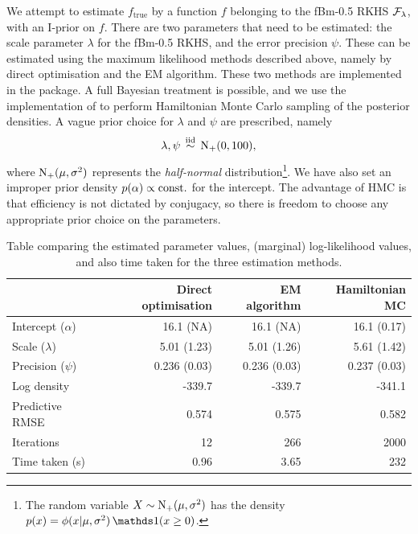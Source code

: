 We attempt to estimate $f_\text{true}$ by a function $f$ belonging to the fBm-0.5 RKHS ${\mathcal F}_\lambda$, with an I-prior on $f$.
There are two parameters that need to be estimated: the scale parameter $\lambda$ for the fBm-0.5 RKHS, and the error precision $\psi$.
These can be estimated using the maximum likelihood methods described above, namely by direct optimisation and the EM algorithm.
These two methods are implemented in the  package. 
A full Bayesian treatment is possible, and we use the  implementation of  to perform Hamiltonian Monte Carlo sampling of the posterior densities.
A vague prior choice for $\lambda$ and $\psi$ are prescribed, namely
\[
  \lambda,\psi \,\overset{\text{iid}}{\sim}\, \operatorname{N}_+(0,100),
\]
where $\operatorname{N}_+(\mu,\sigma^2)$ represents the \emph{half-normal} distribution\footnote{The random variable $X \sim \operatorname{N}_+(\mu,\sigma^2)$ has the density $p(x) = \phi(x|\mu,\sigma^2)\ind(x \geq 0)$.}.
We have also set an improper prior density $p(\alpha) \propto \text{const.}\hspace{0.01em}$ for the intercept.
The advantage of HMC is that efficiency is not dictated by conjugacy, so there is freedom to choose any appropriate prior choice on the parameters.

\begin{table}[hbt]
\centering
\caption{Table comparing the estimated parameter values, (marginal) log-likelihood values, and also time taken for the three estimation methods.}
\label{tab:comparemethodsestimate}
\begin{tabular}{@{}lrrr@{}}
\toprule
               & Direct optimisation & EM algorithm & Hamiltonian MC          \\ \midrule
Intercept ($\alpha$)      & 16.1 (NA)           & 16.1 (NA)    & 16.1 (0.17)  \\
Scale ($\lambda$)      & 5.01 (1.23)         & 5.01 (1.26)  & 5.61 (1.42)     \\
Precision ($\psi$)         & 0.236 (0.03)        & 0.236 (0.03) & 0.237 (0.03)\\[0.5em]
Log density    & -339.7              & -339.7       & -341.1                  \\
Predictive RMSE & 0.574               & 0.575        & 0.582                   \\[0.5em]
Iterations     & 12                  & 266          & 2000                    \\
Time taken (s) & 0.96                & 3.65         & 232                     \\ \bottomrule
\end{tabular}
\end{table}

